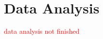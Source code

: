 \documentclass{hasel_thesis}
\begin{document}
\section{Data Analysis}

\textcolor{red}{data analysis not finished}
\end{document}
